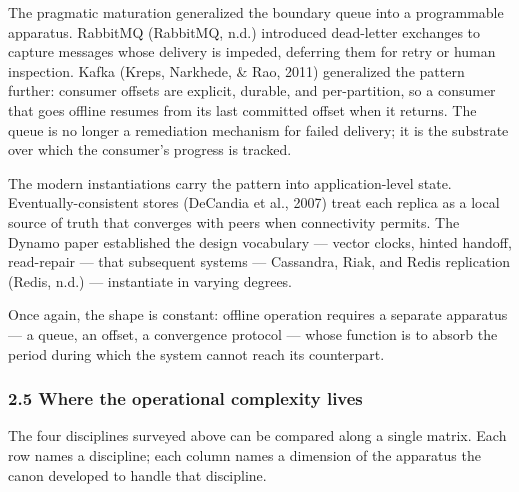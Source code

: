 \documentclass[
]{article}
\begin{document}
The pragmatic maturation generalized the boundary queue into a
programmable apparatus. RabbitMQ (RabbitMQ, n.d.) introduced dead-letter
exchanges to capture messages whose delivery is impeded, deferring them
for retry or human inspection. Kafka (Kreps, Narkhede, \& Rao, 2011)
generalized the pattern further: consumer offsets are explicit, durable,
and per-partition, so a consumer that goes offline resumes from its last
committed offset when it returns. The queue is no longer a remediation
mechanism for failed delivery; it is the substrate over which the
consumer's progress is tracked.

The modern instantiations carry the pattern into application-level
state. Eventually-consistent stores (DeCandia et al., 2007) treat each
replica as a local source of truth that converges with peers when
connectivity permits. The Dynamo paper established the design vocabulary
--- vector clocks, hinted handoff, read-repair --- that subsequent
systems --- Cassandra, Riak, and Redis replication (Redis, n.d.) ---
instantiate in varying degrees.

Once again, the shape is constant: offline operation requires a separate
apparatus --- a queue, an offset, a convergence protocol --- whose
function is to absorb the period during which the system cannot reach
its counterpart.

\subsubsection{2.5 Where the operational complexity
lives}\label{where-the-operational-complexity-lives}

The four disciplines surveyed above can be compared along a single
matrix. Each row names a discipline; each column names a dimension of
the apparatus the canon developed to handle that discipline.
\end{document}
